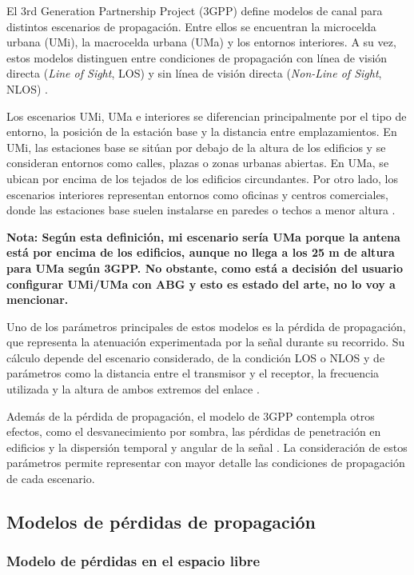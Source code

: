 El 3rd Generation Partnership Project (3GPP) define modelos de canal para distintos escenarios de propagación. Entre ellos se encuentran la microcelda urbana (UMi), la macrocelda urbana (UMa) y los entornos interiores. A su vez, estos modelos distinguen entre condiciones de propagación con línea de visión directa (\textit{Line of Sight}, LOS) y sin línea de visión directa (\textit{Non-Line of Sight}, NLOS) \cite{etsi138901}.


Los escenarios UMi, UMa e interiores se diferencian principalmente por el tipo de entorno, la posición de la estación base y la distancia entre emplazamientos. En UMi, las estaciones base se sitúan por debajo de la altura de los edificios y se consideran entornos como calles, plazas o zonas urbanas abiertas. En UMa, se ubican por encima de los tejados de los edificios circundantes. Por otro lado, los escenarios interiores representan entornos como oficinas y centros comerciales, donde las estaciones base suelen instalarse en paredes o techos a menor altura \cite{etsi138901}.

\par\medskip
\textbf{Nota: Según esta definición, mi escenario sería UMa porque la antena está por encima de los edificios, aunque no llega a los 25 m de altura para UMa según 3GPP. No obstante, como está a decisión del usuario configurar UMi/UMa con ABG y esto es estado del arte, no lo voy a mencionar.}
\par\medskip

Uno de los parámetros principales de estos modelos es la pérdida de propagación, que representa la atenuación experimentada por la señal durante su recorrido. Su cálculo depende del escenario considerado, de la condición LOS o NLOS y de parámetros como la distancia entre el transmisor y el receptor, la frecuencia utilizada y la altura de ambos extremos del enlace \cite{etsi138901}.

Además de la pérdida de propagación, el modelo de 3GPP contempla otros efectos, como el desvanecimiento por sombra, las pérdidas de penetración en edificios y la dispersión temporal y angular de la señal \cite{etsi138901}. La consideración de estos parámetros permite representar con mayor detalle las condiciones de propagación de cada escenario.


\subsection{Modelos de pérdidas de propagación}

\subsubsection{Modelo de pérdidas en el espacio libre}

